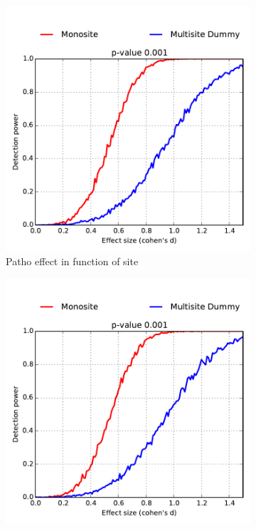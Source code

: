 \documentclass[authoryear]{elsarticle}
\begin{document}
\begin{figure}
        \centering
        \begin{subfigure}[b]{0.475\textwidth}
            \centering
            \includegraphics[width=\textwidth]{../figures/detect_pow_2080bal7030_var2_site0.pdf}
            {\tiny{ Patho effect in function of site}}    
            \label{fig:2080 bal7030 var2 site0}
        \end{subfigure}
        \hfill
        \begin{subfigure}[b]{0.475\textwidth}  
            \centering 
            \includegraphics[width=\textwidth]{../figures/detect_pow_2080bal7030_var2_site05.pdf}

\end{subfigure}
\end{figure}
\end{document}
